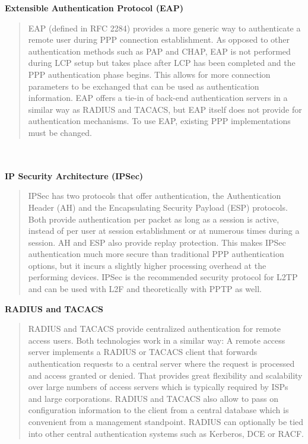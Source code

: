 \documentclass[10pt,a4paper]{article}
\begin{document}
\begin{itemize}
\begin{itemize}
\textbf{Extensible Authentication Protocol (EAP)}
\begin{quote}
EAP (defined in RFC 2284) provides a more generic way to authenticate a
remote user during PPP connection establishment. As opposed to other
authentication methods such as PAP and CHAP, EAP is not performed during
LCP setup but takes place after LCP has been completed and the PPP
authentication phase begins. This allows for more connection parameters to be
exchanged that can be used as authentication information. EAP offers a tie-in of
back-end authentication servers in a similar way as RADIUS and TACACS, but
EAP itself does not provide for authentication mechanisms. To use EAP, existing
PPP implementations must be changed.
\end{quote}
\\
\\
\textbf{IP Security Architecture (IPSec)}
\begin{quote}
IPSec has two protocols that offer authentication, the Authentication Header (AH)
and the Encapsulating Security Payload (ESP) protocols. Both provide
authentication per packet as long as a session is active, instead of per user at
session establishment or at numerous times during a session. AH and ESP also
provide replay protection. This makes IPSec authentication much more secure
than traditional PPP authentication options, but it incurs a slightly higher
processing overhead at the performing devices. IPSec is the recommended
security protocol for L2TP and can be used with L2F and theoretically with PPTP
as well.
\end{quote}


\textbf{RADIUS and TACACS}
\begin{quote}
RADIUS and TACACS provide centralized authentication for remote access
users. Both technologies work in a similar way: A remote access server
implements a RADIUS or TACACS client that forwards authentication requests to
a central server where the request is processed and access granted or denied.
That provides great flexibility and scalability over large numbers of access
servers which is typically required by ISPs and large corporations. RADIUS and
TACACS also allow to pass on configuration information to the client from a
central database which is convenient from a management standpoint. RADIUS
can optionally be tied into other central authentication systems such as Kerberos,
DCE or RACF.
\end{quote}




\end{itemize}
\end{itemize}
\end{document}
